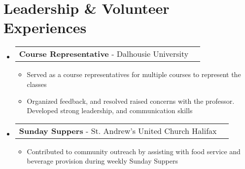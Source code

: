 \documentclass[letterpaper,11pt]{article}
\makeatletter
\newcommand{\resumeLeadershipHeading}[2]{
    \item
    \begin{tabular*}{0.97\textwidth}{l@{\extracolsep{\fill}}r}
      \small#1 & \small#2 \\
    \end{tabular*}\vspace{-5pt}
}
\newcommand{\resumeItem}[1] {\item\small {#1 \vspace{-4pt}}}
\newcommand{\resumeSubHeadingListStart}{\begin{itemize}[leftmargin=0.1in, label={}]}
\newcommand{\resumeSubHeadingListEnd}{\end{itemize}}
\newcommand{\resumeItemListStart}{\begin{itemize}\vspace{-2pt}}
\newcommand{\resumeItemListEnd}{\end{itemize}\vspace{-7pt}}
\makeatother
\begin{document}
\section{Leadership \& Volunteer Experiences}
    \resumeSubHeadingListStart
        \resumeLeadershipHeading
        {\textbf{Course Representative} - Dalhousie University}{}
        \resumeItemListStart
            \resumeItem{Served as a course representatives for multiple courses to represent the classes}
            \resumeItem{Organized feedback, and resolved raised concerns with the professor. Developed strong leadership, and communication skills}
        \resumeItemListEnd

        \resumeLeadershipHeading
        {\textbf{Sunday Suppers} - St. Andrew's United Church Halifax}{}
        \resumeItemListStart
            \resumeItem{Contributed to community outreach by assisting with food service and beverage provision during weekly Sunday Suppers}
        \resumeItemListEnd
    \resumeSubHeadingListEnd

\end{document}
